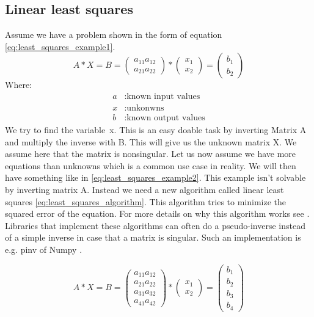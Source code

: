 \documentclass[11pt,a4paper,titlepage,oneside]{report}
\begin{document}
\subsection{Linear least squares}
Assume we have a problem shown in the form of equation \ref{eq:least_squares_example1}.
\begin{equation}\label{eq:least_squares_example1}
  A*X=B=\begin{pmatrix}
    a_{11} a_{12} \\
    a_{21} a_{22}
  \end{pmatrix}*
  \begin{pmatrix}
    x_1 \\
    x_2
  \end{pmatrix}=
  \begin{pmatrix}
    b_1 \\
    b_2
  \end{pmatrix}
\end{equation}
Where:
\begin{align*}
  a		  &: \text{known input values}\\
  x	  	&: \text{unkonwns}\\
  b		  &: \text{known output values}
\end{align*}
We try to find the variable x. This is an easy doable task by inverting Matrix A and multiply the inverse with B. This will give us the unknown matrix X. We assume here that the matrix is nonsingular. Let us now assume we have more equations than unknowns which is a common use case in reality. We will then have something like in \ref{eq:least_squares_example2}. This example isn't solvable by inverting matrix A. Instead we need a new algorithm called linear least squares \ref{eq:least_squares_algorithm}. This algorithm tries to minimize the squared error of the equation. For more details on why this algorithm works see \cite{Hayes}. Libraries that implement these algorithms can often do a pseudo-inverse instead of a simple inverse in case that a matrix is singular. Such an implementation is e.g. pinv of Numpy \cite{pinv}.

\begin{equation}\label{eq:least_squares_example2}
  A*X=B=\begin{pmatrix}
    a_{11} a_{12} \\
    a_{21} a_{22} \\
    a_{31} a_{32} \\
    a_{41} a_{42}
  \end{pmatrix}*
  \begin{pmatrix}
    x_1 \\
    x_2
  \end{pmatrix}=
  \begin{pmatrix}
    b_1 \\
    b_2 \\
    b_3 \\
    b_4
  \end{pmatrix}
\end{equation}
\end{document}
